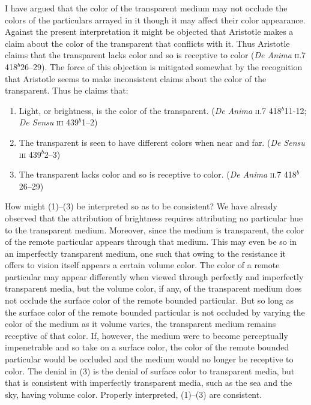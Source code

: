 I have argued that the color of the transparent medium may not occlude the colors of the particulars arrayed in it though it may affect their color appearance. Against the present interpretation it might be objected that Aristotle makes a claim about the color of the transparent that conflicts with it. Thus Aristotle claims that the transparent lacks color and so is receptive to color (\emph{De Anima} \textsc{ii}.7 418\( ^{b} \)26--29). The force of this objection is mitigated somewhat by the recognition that Aristotle seems to make inconsistent claims about the color of the transparent. Thus he claims that:
\begin{enumerate}[(1)]
	\item Light, or brightness, is the color of the transparent. (\emph{De Anima} \textsc{ii}.7 418\( ^{b} \)11-12; \emph{De Sensu} \textsc{iii} 439\( ^{b} \)1--2)
	\item The transparent is seen to have different colors when near and far. (\emph{De Sensu} \textsc{iii} 439\( ^{b} \)2--3)
	\item The transparent lacks color and so is receptive to color. (\emph{De Anima} \textsc{ii}.7 418\( ^{b} \)26--29)
\end{enumerate}
How might (1)--(3) be interpreted so as to be consistent? We have already observed that the attribution of brightness requires attributing no particular hue to the transparent medium. Moreover, since the medium is transparent, the color of the remote particular appears through that medium. This may even be so in an imperfectly transparent medium, one such that owing to the resistance it offers to vision itself appears a certain volume color. The color of a remote particular may appear differently when viewed through perfectly and imperfectly transparent media, but the volume color, if any, of the transparent medium does not occlude the surface color of the remote bounded particular. But so long as the surface color of the remote bounded particular is not occluded by varying the color of the medium as it volume varies, the transparent medium remains receptive of that color. If, however, the medium were to become perceptually impenetrable and so take on a surface color, the color of the remote bounded particular would be occluded and the medium would no longer be receptive to color. The denial in (3) is the denial of surface color to transparent media, but that is consistent with imperfectly transparent media, such as the sea and the sky, having volume color. Properly interpreted, (1)--(3) are consistent.

